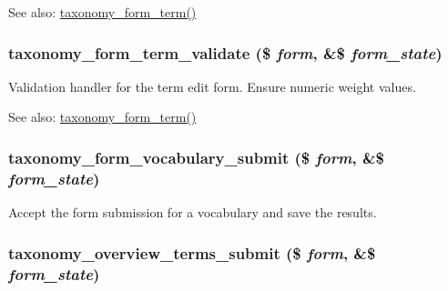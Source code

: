 \begin{Desc}
\item[See also:]\hyperlink{group__forms_gc57918eae4868ce5e1c8d62c995ae295}{taxonomy\_\-form\_\-term()} \end{Desc}
\hypertarget{taxonomy_8admin_8inc_b8a69acec84eb6217604c066b33deab1}{
\subsubsection[{taxonomy\_\-form\_\-term\_\-validate}]{\setlength{\rightskip}{0pt plus 5cm}taxonomy\_\-form\_\-term\_\-validate (\$ {\em form}, \/  \&\$ {\em form\_\-state})}}
\label{taxonomy_8admin_8inc_b8a69acec84eb6217604c066b33deab1}


Validation handler for the term edit form. Ensure numeric weight values.

\begin{Desc}
\item[See also:]\hyperlink{group__forms_gc57918eae4868ce5e1c8d62c995ae295}{taxonomy\_\-form\_\-term()} \end{Desc}
\hypertarget{taxonomy_8admin_8inc_5fe8d2d826372a29a068cd2c39e38636}{
\subsubsection[{taxonomy\_\-form\_\-vocabulary\_\-submit}]{\setlength{\rightskip}{0pt plus 5cm}taxonomy\_\-form\_\-vocabulary\_\-submit (\$ {\em form}, \/  \&\$ {\em form\_\-state})}}
\label{taxonomy_8admin_8inc_5fe8d2d826372a29a068cd2c39e38636}


Accept the form submission for a vocabulary and save the results. \hypertarget{taxonomy_8admin_8inc_fb672457712a0a215cdeaa91748b4517}{
\subsubsection[{taxonomy\_\-overview\_\-terms\_\-submit}]{\setlength{\rightskip}{0pt plus 5cm}taxonomy\_\-overview\_\-terms\_\-submit (\$ {\em form}, \/  \&\$ {\em form\_\-state})}}
\label{taxonomy_8admin_8inc_fb672457712a0a215cdeaa91748b4517}


